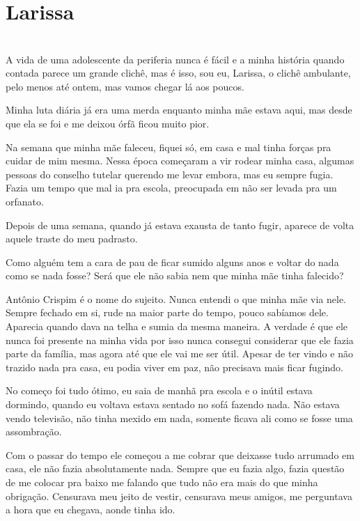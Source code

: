 \newpage


\ifdefined\useChapters
\chapter{Larissa}
\else
\chapter{}
\fi
A vida de uma adolescente da periferia nunca é fácil e a minha história quando contada parece um grande clichê, mas é isso, sou eu, Larissa, o clichê ambulante, pelo menos até ontem, mas vamos chegar lá aos poucos.

Minha luta diária já era uma merda enquanto minha mãe estava aqui, mas desde que ela se foi e me deixou órfã ficou muito pior.

Na semana que minha mãe faleceu, fiquei só, em casa e mal tinha forças pra cuidar de mim mesma. Nessa época começaram a vir rodear minha casa, algumas pessoas do conselho tutelar querendo me levar embora, mas eu sempre fugia. Fazia um tempo que mal ia pra escola, preocupada em não ser levada pra um orfanato.

Depois de uma semana, quando já estava exausta de tanto fugir, aparece de volta aquele traste do meu padrasto. 

Como alguém tem a cara de pau de ficar sumido alguns anos e voltar do nada como se nada fosse? Será que ele não sabia nem que minha mãe tinha falecido?

Antônio Crispim é o nome do sujeito. Nunca entendi o que minha mãe via nele. Sempre fechado em si, rude na maior parte do tempo, pouco sabíamos dele. Aparecia quando dava na telha e sumia da mesma maneira. A verdade é que ele nunca foi presente na minha vida por isso nunca consegui considerar que ele fazia parte da família, mas agora até que ele vai me ser útil. Apesar de ter vindo e não trazido nada pra casa, eu podia viver em paz, não precisava mais ficar fugindo.

No começo foi tudo ótimo, eu saia de manhã pra escola e o inútil estava dormindo, quando eu voltava estava sentado no sofá fazendo nada. Não estava vendo televisão, não tinha mexido em nada, somente ficava ali como se fosse uma assombração.

Com o passar do tempo ele começou a me cobrar que deixasse tudo arrumado em casa, ele não fazia absolutamente nada. Sempre que eu fazia algo, fazia questão de me colocar pra baixo me falando que tudo não era mais do que minha obrigação. Censurava meu jeito de vestir, censurava meus amigos, me perguntava a hora que eu chegava, aonde tinha ido.

